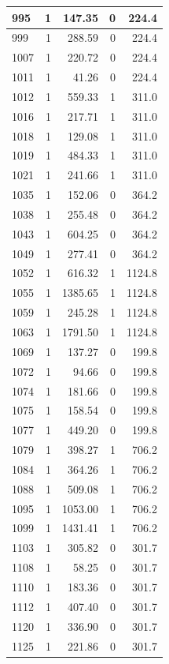 \documentclass[
  12pt,
]{book}
\begin{document}
\begin{tabular}{l|r|r|r|r}
\hline
995 & 1 & 147.35 & 0 & 224.4\\
\hline
999 & 1 & 288.59 & 0 & 224.4\\
\hline
1007 & 1 & 220.72 & 0 & 224.4\\
\hline
1011 & 1 & 41.26 & 0 & 224.4\\
\hline
1012 & 1 & 559.33 & 1 & 311.0\\
\hline
1016 & 1 & 217.71 & 1 & 311.0\\
\hline
1018 & 1 & 129.08 & 1 & 311.0\\
\hline
1019 & 1 & 484.33 & 1 & 311.0\\
\hline
1021 & 1 & 241.66 & 1 & 311.0\\
\hline
1035 & 1 & 152.06 & 0 & 364.2\\
\hline
1038 & 1 & 255.48 & 0 & 364.2\\
\hline
1043 & 1 & 604.25 & 0 & 364.2\\
\hline
1049 & 1 & 277.41 & 0 & 364.2\\
\hline
1052 & 1 & 616.32 & 1 & 1124.8\\
\hline
1055 & 1 & 1385.65 & 1 & 1124.8\\
\hline
1059 & 1 & 245.28 & 1 & 1124.8\\
\hline
1063 & 1 & 1791.50 & 1 & 1124.8\\
\hline
1069 & 1 & 137.27 & 0 & 199.8\\
\hline
1072 & 1 & 94.66 & 0 & 199.8\\
\hline
1074 & 1 & 181.66 & 0 & 199.8\\
\hline
1075 & 1 & 158.54 & 0 & 199.8\\
\hline
1077 & 1 & 449.20 & 0 & 199.8\\
\hline
1079 & 1 & 398.27 & 1 & 706.2\\
\hline
1084 & 1 & 364.26 & 1 & 706.2\\
\hline
1088 & 1 & 509.08 & 1 & 706.2\\
\hline
1095 & 1 & 1053.00 & 1 & 706.2\\
\hline
1099 & 1 & 1431.41 & 1 & 706.2\\
\hline
1103 & 1 & 305.82 & 0 & 301.7\\
\hline
1108 & 1 & 58.25 & 0 & 301.7\\
\hline
1110 & 1 & 183.36 & 0 & 301.7\\
\hline
1112 & 1 & 407.40 & 0 & 301.7\\
\hline
1120 & 1 & 336.90 & 0 & 301.7\\
\hline
1125 & 1 & 221.86 & 0 & 301.7\\

\end{tabular}
\end{document}
